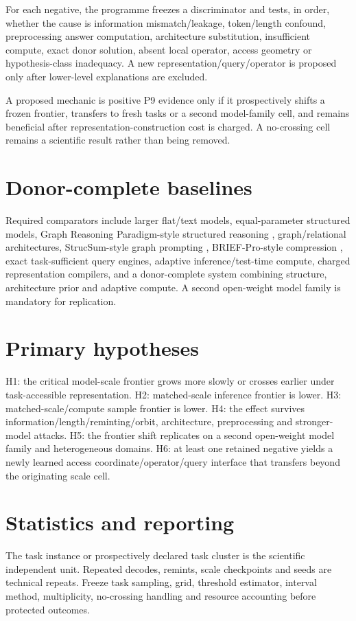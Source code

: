 \documentclass[11pt]{article}
\begin{document}
For each negative, the programme freezes a discriminator and tests, in order, whether the cause is information mismatch/leakage, token/length confound, preprocessing answer computation, architecture substitution, insufficient compute, exact donor solution, absent local operator, access geometry or hypothesis-class inadequacy. A new representation/query/operator is proposed only after lower-level explanations are excluded.

A proposed mechanic is positive P9 evidence only if it prospectively shifts a frozen frontier, transfers to fresh tasks or a second model-family cell, and remains beneficial after representation-construction cost is charged. A no-crossing cell remains a scientific result rather than being removed.

\section{Donor-complete baselines}
Required comparators include larger flat/text models, equal-parameter structured models, Graph Reasoning Paradigm-style structured reasoning \cite{grp2026}, graph/relational architectures, StrucSum-style graph prompting \cite{strucsum2026}, BRIEF-Pro-style compression \cite{brief2026}, exact task-sufficient query engines, adaptive inference/test-time compute, charged representation compilers, and a donor-complete system combining structure, architecture prior and adaptive compute. A second open-weight model family is mandatory for replication.

\section{Primary hypotheses}
H1: the critical model-scale frontier grows more slowly or crosses earlier under task-accessible representation. H2: matched-scale inference frontier is lower. H3: matched-scale/compute sample frontier is lower. H4: the effect survives information/length/reminting/orbit, architecture, preprocessing and stronger-model attacks. H5: the frontier shift replicates on a second open-weight model family and heterogeneous domains. H6: at least one retained negative yields a newly learned access coordinate/operator/query interface that transfers beyond the originating scale cell.

\section{Statistics and reporting}
The task instance or prospectively declared task cluster is the scientific independent unit. Repeated decodes, remints, scale checkpoints and seeds are technical repeats. Freeze task sampling, grid, threshold estimator, interval method, multiplicity, no-crossing handling and resource accounting before protected outcomes.
\end{document}
